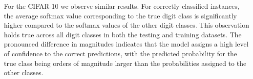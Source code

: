 




For the CIFAR-10 we observe similar results. For correctly classified instances, the average softmax value corresponding to the true digit class is significantly higher compared to the softmax values of the other digit classes. This observation holds true across all digit classes in both the testing and training datasets. The pronounced difference in magnitudes indicates that the model assigns a high level of confidence to the correct predictions, with the predicted probability for the true class being orders of magnitude larger than the probabilities assigned to the other classes.

